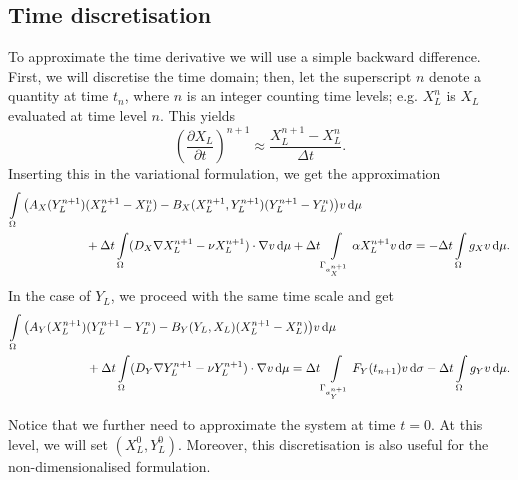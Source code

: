 \documentclass[11pt]{article}
\numberwithin{equation}{section}
\begin{document}
\subsection{Time discretisation}

To approximate the time derivative we will use a simple backward difference. First, we will discretise the time domain; then, let the superscript $n$ denote a quantity at time $t_n$, where $n$ is an integer counting time levels; e.g. $X_L^n$ is $X_L$ evaluated at time level $n$. This yields
\begin{equation}
    \left(\frac{\partial X_L}{\partial t}\right)^{n+1} \approx \frac{X_L^{n+1} - X_L^n}{\Delta t}.
\end{equation}
Inserting this in the variational formulation, we get the approximation
\begin{equation}
\begin{aligned}
    \int\limits_\Omega
    \big(
    A_X(Y_L^{n+1}) &(X_L^{n+1} - X_L^n) - B_X(X_L^{n+1},Y_L^{n+1}) (Y_L^{n+1} - Y_L^n)  
    \big) v \dif \mu
    \\
    &+
    \Delta t \int\limits_\Omega        (D_X \nabla X_L^{n+1} - \nu X_L^{n+1}) \cdot \nabla v  \dif \mu
    +
    \Delta t \int\limits_{\Gamma_{a_X^{n+1}}}    \alpha X_L^{n+1} v    \dif \sigma
    =
    -\Delta t \int\limits_\Omega        g_X v \dif \mu.
\end{aligned}
\end{equation}
In the case of $Y_L$, we proceed with the same time scale and get
\begin{equation}
\begin{aligned}
    \int\limits_\Omega
    \big(
        A_Y(X_L^{n+1}) & (Y_L^{n+1} - Y_L^n)  - B_Y(Y_L,X_L) (X_L^{n+1} - X_L^n)
    \big) v \dif \mu
    \\
    &
    + \Delta t\int\limits_\Omega        (D_Y \nabla Y_L^{n+1} - \nu Y_L^{n+1}) \cdot \nabla v  \dif \mu
    =
    \Delta t\int\limits_{\Gamma_{a_Y^{n+1}}}     F_Y(t_{n+1}) v    \dif \sigma
    -\Delta t\int\limits_\Omega        g_Y v \dif \mu.
\end{aligned}
\end{equation}

Notice that we further need to approximate the system at time \(t=0\). At this level, we will set \( (X_L^0,Y_L^0)\). Moreover, this discretisation is also useful for the non-dimensionalised formulation.
\end{document}
